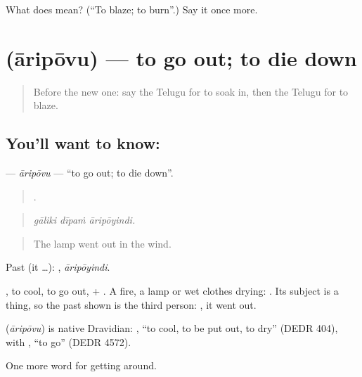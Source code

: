 \begin{tcolorbox}[breakable,colback=teal!4,colframe=teal!35!black,title={Before you move on}]
What does  mean? (\textquotedblleft{}To blaze; to burn\textquotedblright{}.) Say it once more.
\end{tcolorbox}
\section[\texorpdfstring{\te{ఆరిపోవు} (āripōvu)}{ఆరిపోవు (āripōvu)}]{ (āripōvu) — to go out; to die down}

\label{lesson:TE-C483-aripovu}



\begin{quote}
Before the new one: say the Telugu for to soak in, then the Telugu for to blaze.
\end{quote}

\subsection*{You'll want to know: }
\textbf{} — \emph{āripōvu} — \textquotedblleft{}to go out; to die down\textquotedblright{}.

\begin{quote}
  .
\end{quote}

\begin{quote}
\emph{gāliki dīpaṁ āripōyindi.}
\end{quote}

\begin{quote}
The lamp went out in the wind.
\end{quote}

Past (it …): , \emph{āripōyindi}.

, to cool, to go out, + . A fire, a lamp or wet clothes drying:  . Its subject is a thing, so the past shown is the third person: , it went out.

\begin{cousinweb}
\textbf{} (\emph{āripōvu}) is native Dravidian: , \textquotedblleft{}to cool, to be put out, to dry\textquotedblright{} (DEDR 404), with , \textquotedblleft{}to go\textquotedblright{} (DEDR 4572).
\end{cousinweb}

\begin{grammarlens}[title={What you've built}]
One more word for getting around.
\end{grammarlens}

